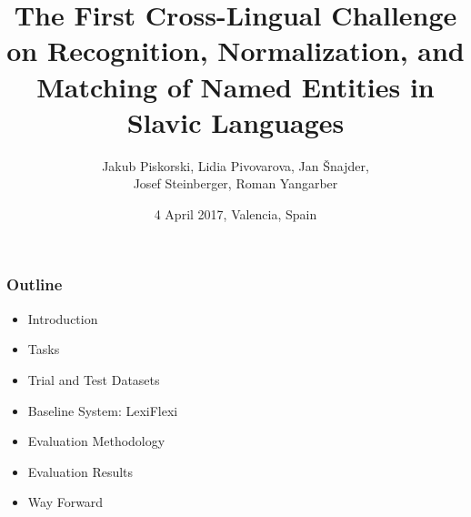 \documentclass{beamer}
\title[Cross-lingual NER Challenge]{\textbf{The First Cross-Lingual Challenge on Recognition, Normalization,
and Matching of Named Entities in Slavic Languages}}
\author[J. Piskorski et. al]{Jakub Piskorski, Lidia Pivovarova, Jan Šnajder,\\ Josef Steinberger, Roman Yangarber\\}
\date{{\color{white} 4 April 2017, Valencia, Spain}}
\begin{document}
\maketitle

%



\begin{frame}
 \frametitle{Outline}

\begin{itemize}
\item Introduction
\item Tasks
\item Trial and Test Datasets
\item Baseline System: LexiFlexi
\item Evaluation Methodology
\item Evaluation Results
\item Way Forward
\end{itemize}


\end{frame}
\end{document}
